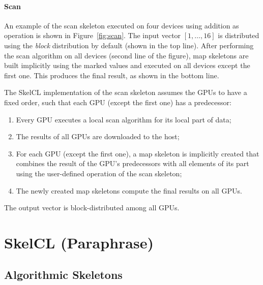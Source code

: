 \paragraph{Scan}
An example of the scan skeleton executed on four devices using addition as operation is shown in Figure~\ref{fig:scan}.
The input vector $[1,\ldots,16]$ is distributed using the \emph{block} distribution by default (shown in the top line).
After performing the scan algorithm on all devices (second line of the figure), map skeletons are built implicitly using the marked values and executed on all devices except the first one.
This produces the final result, as shown in the bottom line.

The SkelCL implementation of the scan skeleton assumes the GPUs to have a fixed order, such that each GPU (except the first one) has a predecessor:
\begin{enumerate}
 \item Every GPU executes a local scan algorithm for its local part of data;
 \item The results of all GPUs are downloaded to the host;
 \item For each GPU (except the first one), a map skeleton is implicitly created that combines the result of the GPU's predecessors with all elements of its part using the user-defined operation of the scan skeleton;
 \item The newly created map skeletons compute the final results on all GPUs.
\end{enumerate}
The output vector is block-distributed among all GPUs.




\section{SkelCL (Paraphrase)}

\subsection{Algorithmic Skeletons}

